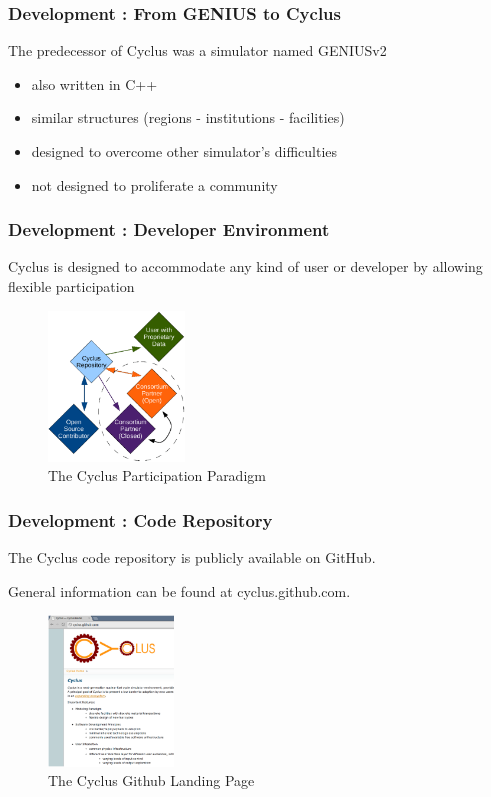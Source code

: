 \begin{frame}[ctb!]
  \frametitle{Development : From GENIUS to Cyclus}
  The predecessor of Cyclus was a simulator named GENIUSv2 \cite{oliver_geniusv2:_2009}
  \begin{itemize}
    \item also written in C++
    \item similar structures (regions - institutions - facilities)
    \item designed to overcome other simulator's difficulties
    \item not designed to proliferate a community
  \end{itemize}
\end{frame}

\begin{frame}[ctb!]
  \frametitle{Development : Developer Environment}
  Cyclus is designed to accommodate any kind of user or developer by
  allowing flexible participation \cite{huff_prelim_2011}
  \begin{figure}[htbp!]
    \begin{center}
      \includegraphics[height=4cm]{community.eps}
    \end{center}
    \caption{The Cyclus Participation Paradigm} 
    \label{fig:community}
  \end{figure}
\end{frame}

\begin{frame}[ctb!]
  \frametitle{Development : Code Repository}
  The Cyclus code repository is publicly available on GitHub.

  \vspace{0.2cm}

  General information can be found at cyclus.github.com.
  \begin{figure}[htbp!]
    \begin{center}
      \includegraphics[height=4cm]{cyclus-github.ps}
    \end{center}
    \caption{The Cyclus Github Landing Page} 
    \label{fig:cyclus-github}
  \end{figure}
\end{frame}


